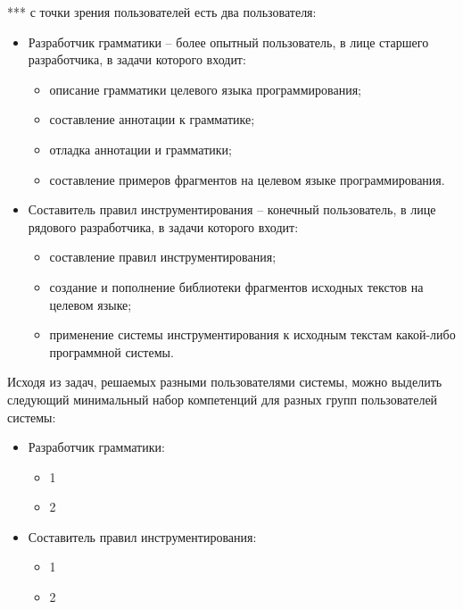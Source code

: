 ***
с точки зрения пользователей есть два пользователя:

\begin{itemize}[noitemsep]
  \item Разработчик грамматики -- более опытный пользователь, в лице старшего разработчика, в задачи которого входит:
    \begin{itemize}[noitemsep]
      \item описание грамматики целевого языка программирования;
      \item составление аннотации к грамматике;
      \item отладка аннотации и грамматики;
      \item составление примеров фрагментов на целевом языке программирования.
    \end{itemize}

  \item Составитель правил инструментирования -- конечный пользователь, в лице рядового разработчика, в задачи которого входит:
    \begin{itemize}[noitemsep]
      \item составление правил инструментирования;
      \item создание и пополнение библиотеки фрагментов исходных текстов на целевом языке;
      \item применение системы инструментирования к исходным текстам какой-либо программной системы.
    \end{itemize}
\end{itemize}

Исходя из задач, решаемых разными пользователями системы, можно выделить следующий минимальный набор компетенций для разных групп пользователей системы:
\begin{itemize}[noitemsep]
  \item Разработчик грамматики:
    \begin{itemize}[noitemsep]
      \item 1
      \item 2
    \end{itemize}

  \item Составитель правил инструментирования:
    \begin{itemize}[noitemsep]
      \item 1
      \item 2
    \end{itemize}
\end{itemize}


